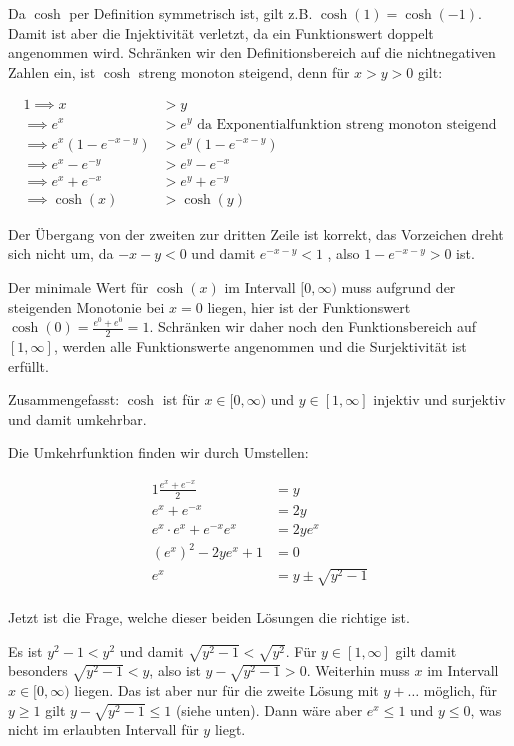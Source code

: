 \item Da $\cosh$ per Definition symmetrisch ist, gilt z.B. $\cosh(1) = \cosh(-1)$. Damit ist aber die Injektivität verletzt, da ein Funktionswert doppelt angenommen wird. Schränken wir den Definitionsbereich auf die nichtnegativen Zahlen ein, ist $\cosh$ streng monoton steigend, denn für $x>y>0$ gilt:

\begin{alignat*}{1}
	\implies x &> y \\
	\implies e^x &> e^y \text{ da Exponentialfunktion streng monoton steigend} \\
	\implies e^x (1-e^{-x-y}) &> e^y (1-e^{-x-y}) \\
	\implies e^x-e^{-y} &> e^y - e^{-x} \\
	\implies e^x + e^{-x} &> e^y + e^{-y} \\
	\implies \cosh(x) &> \cosh(y)
\end{alignat*}

Der Übergang von der zweiten zur dritten Zeile ist korrekt, das Vorzeichen dreht sich nicht um, da $-x-y<0$ und damit $e^{-x-y} < 1$ , also $1-e^{-x-y} > 0$ ist.

Der minimale Wert für $\cosh(x)$ im Intervall $[0, \infty)$ muss aufgrund der steigenden Monotonie bei $x=0$ liegen, hier ist der Funktionswert $\cosh(0) = \frac{e^0+e^0}{2} = 1$. Schränken wir daher noch den Funktionsbereich auf $[1, \infty]$, werden alle Funktionswerte angenommen und die Surjektivität ist erfüllt.

Zusammengefasst: $\cosh$ ist für $x \in [0, \infty)$ und $y \in [1,\infty]$ injektiv und surjektiv und damit umkehrbar.

Die Umkehrfunktion finden wir durch Umstellen:

\begin{alignat*}{1}
	\frac{e^x+e^{-x}}{2} &= y \\
	 e^x+e^{-x} &= 2y \\
	 e^x \cdot e^x + e^{-x} e^x &= 2ye^x \\
	 (e^x)^2 - 2ye^x + 1 &= 0 \\
	 e^x &= y \pm \sqrt{y^2-1} \\
\end{alignat*}

Jetzt ist die Frage, welche dieser beiden Lösungen die richtige ist.

Es ist $y^2-1 < y^2$ und damit $\sqrt{y^2-1} < \sqrt{y^2}$. Für $y \in [1,\infty]$ gilt damit besonders $\sqrt{y^2-1} < y$, also ist $y - \sqrt{y^2-1} > 0$. Weiterhin muss $x$ im Intervall $x \in [0, \infty)$ liegen. Das ist aber nur für die zweite Lösung mit $y+\dots$ möglich, für $y \ge 1$ gilt $y - \sqrt{y^2-1} \le 1$ (siehe unten). Dann wäre aber $e^x \le 1$ und $y\le 0$, was nicht im erlaubten Intervall für $y$ liegt.

